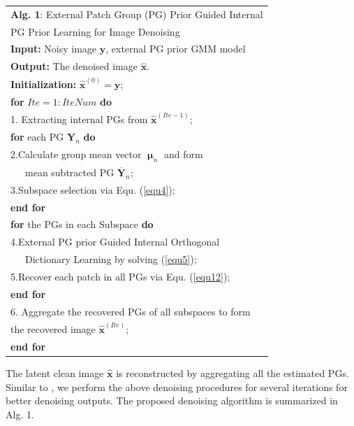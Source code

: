 \documentclass[10pt,twocolumn,letterpaper]{article}
\begin{document}
\begin{table}
\label{alg1}
\begin{tabular}{l}
\hline
\textbf{Alg. 1}: External Patch Group (PG) Prior Guided Internal
\\
\quad \quad \quad PG Prior Learning for Image Denoising
\\
\hline
\textbf{Input:} Noisy image $\mathbf{y}$, external PG prior GMM model
\\
\textbf{Output:} The denoised image $\hat{\mathbf{x}}$.
\\
\textbf{Initialization:} $\hat{\mathbf{x}}^{(0)}=\mathbf{y}$;
\\
\textbf{for} $Ite = 1:IteNum$ \textbf{do}
\\
1. Extracting internal PGs from $\hat{\mathbf{x}}^{(Ite-1)}$;
\\
\quad\textbf{for} each PG $\mathbf{Y}_{n}$ \textbf{do}
\\
2.\quad Calculate group mean vector $\boldsymbol{\upmu}_{n}$ and form 
\\
\quad \ \ \ mean subtracted PG $\mathbf{\overline{Y}}_{n}$;
\\
3.\quad Subspace selection via Equ. (\ref{equ4});
\\
\quad\textbf{end for}
\\
\quad\textbf{for} the PGs in each Subspace \textbf{do}
\\
4.\quad External PG prior Guided Internal Orthogonal
\\
\quad \ \ \ Dictionary Learning by solving (\ref{equ5});
\\
5.\quad Recover each patch in all PGs via Equ. (\ref{equ12});
\\
\quad\textbf{end for}
\\
6. Aggregate the recovered PGs of all subspaces to form
\\
\quad the recovered image $\hat{\mathbf{x}}^{(Ite)}$;
\\
\textbf{end for}
\\
\hline
\end{tabular}
\end{table}
The latent clean image $\hat{\mathbf{x}}$ is reconstructed by aggregating all the estimated PGs. Similar to \cite{pgpd}, we perform the above denoising procedures for several iterations for better denoising outputs. The proposed denoising algorithm is summarized in Alg. 1.
\end{document}
